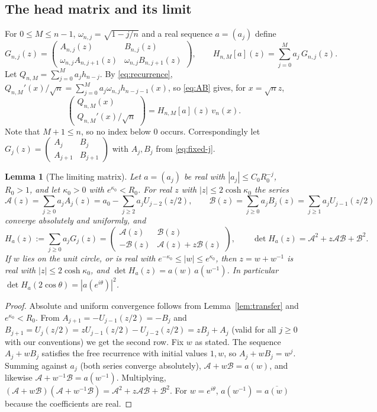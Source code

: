 \documentclass[11pt]{amsart}
\newtheorem{lemma}[theorem]{Lemma}
\theoremstyle{definition}
\theoremstyle{remark}
\numberwithin{equation}{section}
\newcommand{\Q}{\mathbb{Q}}
\begin{document}
\subsection{The head matrix and its limit}
For $0\le M\le n-1$, $\omega_{n,j}=\sqrt{1-j/n}$ and a real sequence $a=(a_j)$ define
\[
G_{n,j}(z)=\begin{pmatrix}A_{n,j}(z)&B_{n,j}(z)\\ \omega_{n,j}A_{n,j+1}(z)&\omega_{n,j}B_{n,j+1}(z)\end{pmatrix},\qquad H_{n,M}[a](z)=\sum_{j=0}^{M}a_j\,G_{n,j}(z).
\]
Let $Q_{n,M}=\sum_{j=0}^{M}a_jh_{n-j}$. By \eqref{eq:recurrence}, $Q_{n,M}'(x)/\sqrt n=\sum_{j=0}^{M}a_j\omega_{n,j}h_{n-j-1}(x)$, so \eqref{eq:AB} gives, for $x=\sqrt nz$,
\begin{equation}\label{eq:head}
\begin{pmatrix}Q_{n,M}(x)\\Q_{n,M}'(x)/\sqrt n\end{pmatrix}=H_{n,M}[a](z)\,v_n(x).
\end{equation}
Note that $M+1\le n$, so no index below $0$ occurs. Correspondingly let $G_j(z)=\begin{pmatrix}A_j&B_j\\A_{j+1}&B_{j+1}\end{pmatrix}$ with $A_j,B_j$ from \eqref{eq:fixed-j}.

\begin{lemma}[The limiting matrix]\label{lem:limit}
Let $a=(a_j)$ be real with $|a_j|\le C_0R_0^{-j}$, $R_0>1$, and let $\kappa_0>0$ with $e^{\kappa_0}<R_0$. For real $z$ with $|z|\le2\cosh\kappa_0$ the series
\[
\mathcal A(z)=\sum_{j\ge0}a_jA_j(z)=a_0-\sum_{j\ge2}a_jU_{j-2}(z/2),\qquad\mathcal B(z)=\sum_{j\ge0}a_jB_j(z)=\sum_{j\ge1}a_jU_{j-1}(z/2)
\]
converge absolutely and uniformly, and
\[
H_a(z):=\sum_{j\ge0}a_jG_j(z)=\begin{pmatrix}\mathcal A(z)&\mathcal B(z)\\-\mathcal B(z)&\mathcal A(z)+z\mathcal B(z)\end{pmatrix},\qquad\det H_a(z)=\mathcal A^2+z\mathcal A\mathcal B+\mathcal B^2 .
\]
If $w$ lies on the unit circle, or is real with $e^{-\kappa_0}\le|w|\le e^{\kappa_0}$, then $z=w+w^{-1}$ is real with $|z|\le2\cosh\kappa_0$, and $\det H_a(z)=a(w)\,a(w^{-1})$. In particular $\det H_a(2\cos\theta)=|a(e^{i\theta})|^2$.
\end{lemma}

\begin{proof}
Absolute and uniform convergence follows from Lemma~\ref{lem:transfer} and $e^{\kappa_0}<R_0$. From $A_{j+1}=-U_{j-1}(z/2)=-B_j$ and $B_{j+1}=U_j(z/2)=zU_{j-1}(z/2)-U_{j-2}(z/2)=zB_j+A_j$ (valid for all $j\ge0$ with our conventions) we get the second row. Fix $w$ as stated. The sequence $A_j+wB_j$ satisfies the free recurrence with initial values $1,w$, so $A_j+wB_j=w^j$. Summing against $a_j$ (both series converge absolutely), $\mathcal A+w\mathcal B=a(w)$, and likewise $\mathcal A+w^{-1}\mathcal B=a(w^{-1})$. Multiplying, $(\mathcal A+w\mathcal B)(\mathcal A+w^{-1}\mathcal B)=\mathcal A^2+z\mathcal A\mathcal B+\mathcal B^2$. For $w=e^{i\theta}$, $a(w^{-1})=\overline{a(w)}$ because the coefficients are real.
\end{proof}
\end{document}
